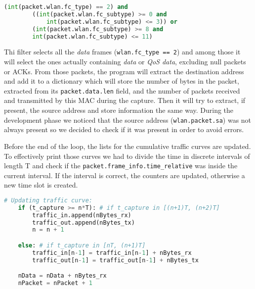 \begin{lstlisting}[language=Python, caption=Packet filter]
    (int(packet.wlan.fc_type) == 2) and 
        ((int(packet.wlan.fc_subtype) >= 0 and 
            int(packet.wlan.fc_subtype) <= 3)) or
        (int(packet.wlan.fc_subtype) >= 8 and 
        int(packet.wlan.fc_subtype) <= 11)
\end{lstlisting}
Thi filter selects all the \textit{data} frames (\texttt{wlan.fc\_type == 2}) and among those it will 
select the ones actually containing \textit{data} or \textit{QoS data}, excluding null packets or ACKs. 
From those packets, the program will extract the destination address and add it to a dictionary
which will store the number of bytes in the packet, extracted from its \texttt{packet.data.len} field, and 
the number of packets received and transmitted by this MAC during the capture.
Then it will try to extract, if present, the source address and store information the same 
way. During the development phase we noticed that the source address (\texttt{wlan.packet.sa}) was 
not always present so we decided to check if it was present in order to avoid errors.

Before the end of the loop, the lists for the cumulative traffic curves are updated. To 
effectively print those curves we had to divide the time in discrete intervals of length T and 
check if the \texttt{packet.frame\_info.time\_relative} was inside the current interval. If the
interval is correct, the counters are updated, otherwise a new time slot is created.

\begin{lstlisting}[language=Python, caption=Traffic curves setup]
    # Updating traffic curve:
    if (t_capture >= n*T): # if t_capture in [(n+1)T, (n+2)T]
        traffic_in.append(nBytes_rx)
        traffic_out.append(nBytes_tx)
        n = n + 1

    else: # if t_capture in [nT, (n+1)T]
        traffic_in[n-1] = traffic_in[n-1] + nBytes_rx
        traffic_out[n-1] = traffic_out[n-1] + nBytes_tx

    nData = nData + nBytes_rx
    nPacket = nPacket + 1
\end{lstlisting}

